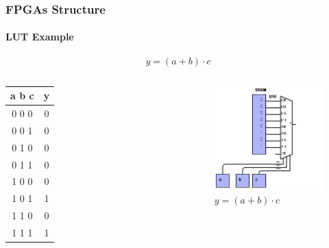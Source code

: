 \documentclass{beamer}
\begin{document}
\begin{frame}
\frametitle{FPGAs Structure}
\framesubtitle{LUT Example}

$$y = ( a + b ) \cdot c $$

\begin{columns}[c]



\begin{table}
\centering
\begin{tabular}{c|c}
a b c & y \\
\hline
0 0 0 & 0\\
0 0 1 & 0\\
0 1 0 & 0\\
0 1 1 & 0\\
1 0 0 & 0\\
1 0 1 & 1\\
1 1 0 & 0\\
1 1 1 & 1\\

\end{tabular}
\end{table}

\centering
\begin{figure}
\includegraphics[width=.9\linewidth,left]{lutExplan.jpg}
\caption{$y = ( a + b ) \cdot c $ }
\end{figure}

\end{columns}
\end{frame}
\end{document}
